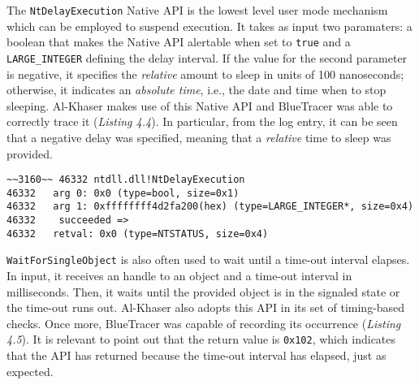 The \texttt{NtDelayExecution} Native API is the lowest level user mode mechanism which can be employed to suspend execution. It takes as input two paramaters: a boolean that makes the Native API alertable when set to \texttt{true} and a \texttt{LARGE\_INTEGER} defining the delay interval. If the value for the second parameter is negative, it specifies the \textit{relative} amount to sleep in units of 100 nanoseconds; otherwise, it indicates an \textit{absolute time}, i.e., the date and time when to stop sleeping. Al-Khaser makes use of this Native API and BlueTracer was able to correctly trace it (\textit{Listing 4.4}). In particular, from the log entry, it can be seen that a negative delay was specified, meaning that a \textit{relative} time to sleep was provided.  

\vspace{0.5cm}
\begin{lstlisting}[caption={Log entry relative to \texttt{NtDelayExecution}},captionpos=b]
~~3160~~ 46332 ntdll.dll!NtDelayExecution
46332 	arg 0: 0x0 (type=bool, size=0x1)
46332 	arg 1: 0xffffffff4d2fa200(hex) (type=LARGE_INTEGER*, size=0x4)
46332    succeeded =>
46332 	retval: 0x0 (type=NTSTATUS, size=0x4)
\end{lstlisting}

\texttt{WaitForSingleObject} is also often used to wait until a time-out interval elapses. In input, it receives an handle to an object and a time-out interval in milliseconds. Then, it waits until the provided object is in the signaled state or the time-out runs out. Al-Khaser also adopts this API in its set of timing-based checks. Once more, BlueTracer was capable of recording its occurrence (\textit{Listing 4.5}). It is relevant to point out that the return value is \texttt{0x102}, which indicates that the API has returned because the time-out interval has elapsed, just as expected.

